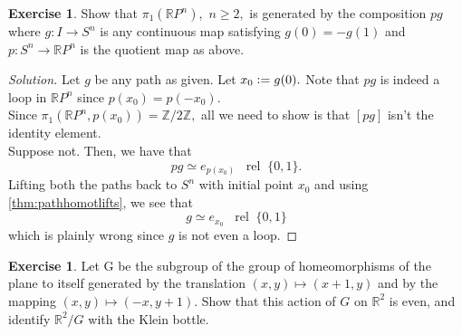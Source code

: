 \documentclass[12pt]{article}
\theoremstyle{definition}
\numberwithin{thm}{section}
\newtheorem{exe}[thm]{Exercise}
\newcommand{\rel}{\;\;\operatorname{rel}\;}
\newenvironment{soln}{\begin{proof}[Solution]}{\end{proof}}
\begin{document}
\begin{exe}
	Show that $\pi_1(\mathbb{R}P^n),$ $n \ge 2,$ is generated by the composition $pg$ where $g : I \to S^n$ is any continuous map satisfying $g(0) = -g(1)$ and $p: S^n \to \mathbb{R}P^n$ is the quotient map as above.
\end{exe}
\begin{soln}
	Let $g$ be any path as given. Let $x_0 \vcentcolon= g(0).$ Note that $pg$ is indeed a loop in $\mathbb{R}P^n$ since $p(x_0) = p(-x_0).$\\
	Since $\pi_1(\mathbb{R}P^n, p(x_0)) = \mathbb{Z}/2\mathbb{Z},$ all we need to show is that $[pg]$ isn't the identity element.\\
	Suppose not. Then, we have that
	\begin{equation*} 
		pg \simeq e_{p(x_0)} \rel \{0, 1\}.
	\end{equation*}
	Lifting both the paths back to $S^n$ with initial point $x_0$ and using \cref{thm:pathhomotlifts}, we see that
	\begin{equation*} 
		g \simeq e_{x_0} \rel\{0, 1\}
	\end{equation*}
	which is plainly wrong since $g$ is not even a loop.
\end{soln}
%
%
%
\begin{exe}
	Let G be the subgroup of the group of homeomorphisms of the plane to itself generated by the translation $(x, y) \mapsto (x + 1, y)$ and by the mapping $(x, y) \mapsto (-x, y + 1).$ Show that this action of $G$ on $\mathbb{R}^2$ is even, and identify $\mathbb{R}^2/G$ with the Klein bottle.
\end{exe}
\end{document}
